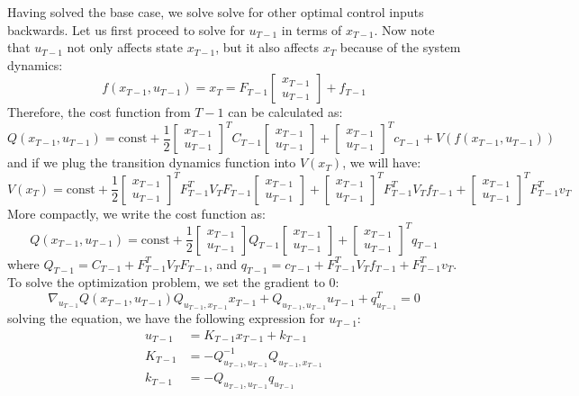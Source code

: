 Having solved the base case, we solve solve for other optimal control inputs backwards. Let us first proceed to solve for $u_{T-1}$ in terms of $x_{T-1}$. Now note that $u_{T-1}$ not only affects state $x_{T-1}$, but it also affects $x_T$ because of the system dynamics:
\[
f(x_{T-1}, u_{T-1}) = x_T = F_{T-1}\begin{bmatrix}x_{T-1}\\u_{T-1}\end{bmatrix} + f_{T-1}
\]
Therefore, the cost function from $T-1$ can be calculated as:
\[
Q(x_{T-1}, u_{T-1}) = \text{const} + \frac{1}{2}\begin{bmatrix}x_{T-1}\\u_{T-1}\end{bmatrix}^TC_{T-1}\begin{bmatrix}x_{T-1}\\u_{T-1}\end{bmatrix} + \begin{bmatrix}x_{T-1}\\u_{T-1}\end{bmatrix}^Tc_{T-1} + V(f(x_{T-1}, u_{T-1}))
\]
and if we plug the transition dynamics function into $V(x_T)$, we will have:
\[
V(x_T) = \text{const} + \frac{1}{2}\begin{bmatrix}x_{T-1}\\u_{T-1}\end{bmatrix}^TF_{T-1}^TV_TF_{T-1}\begin{bmatrix}x_{T-1}\\u_{T-1}\end{bmatrix} + \begin{bmatrix}x_{T-1}\\u_{T-1}\end{bmatrix}^TF_{T-1}^TV_Tf_{T-1}+\begin{bmatrix}x_{T-1}\\u_{T-1}\end{bmatrix}^TF_{T-1}^Tv_T
\]
More compactly, we write the cost function as:
\[
Q(x_{T-1}, u_{T-1}) = \text{const} +\frac{1}{2} \begin{bmatrix}x_{T-1}\\u_{T-1}\end{bmatrix}Q_{T-1}\begin{bmatrix}x_{T-1}\\u_{T-1}\end{bmatrix} + \begin{bmatrix}x_{T-1}\\u_{T-1}\end{bmatrix}^Tq_{T-1}
\]
where $Q_{T-1} = C_{T-1} + F^T_{T-1}V_TF_{T-1}$, and $q_{T-1} = c_{T-1} +  F^T_{T-1}V_Tf_{T-1} + F^T_{T-1}v_T$. To solve the optimization problem, we set the gradient to 0:
\[
\nabla_{u_{T-1}}Q(x_{T-1}, u_{T-1}) Q_{u_{T-1},x_{T-1}}x_{T-1} + Q_{u_{T-1},u_{T-1}}u_{T-1}+q_{u_{T-1}}^T=0
\]
solving the equation, we have the following expression for $u_{T-1}$:
\begin{align*}
    u_{T-1} &= K_{T-1}x_{T-1} + k_{T-1}\\
    K_{T-1} &= -Q^{-1}_{u_{T-1},u_{T-1}}Q_{u_{T-1},x_{T-1}}\\
    k_{T-1} &= -Q_{u_{T-1},u_{T-1}}q_{u_{T-1}}
\end{align*}

